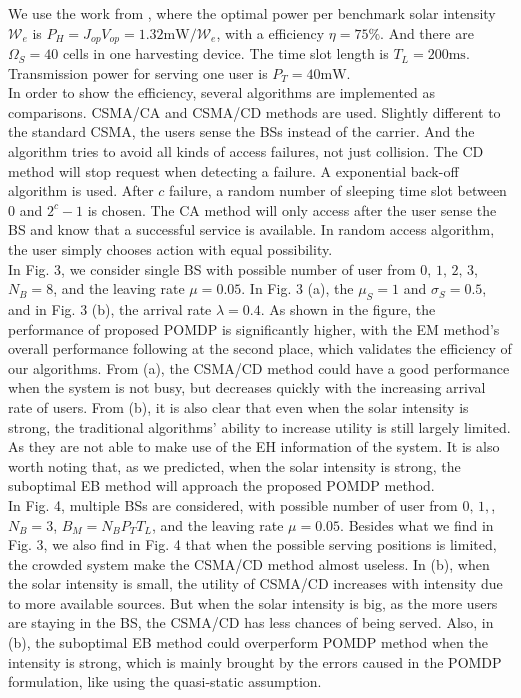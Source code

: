 \documentclass[conference]{IEEEtran}
\begin{document}
We use the work from \cite{circuit}, where the optimal power per benchmark solar intensity \(\mathcal{W}_e\)
is \(P_H = J_{op}V_{op} = 1.32\mbox{mW}/\mathcal{W}_e\), with a efficiency \(\eta = 75 \%\).
And there are \(\Omega_S = 40\) cells in one harvesting device.
The time slot length is \(T_L = 200\mbox{ms}\).
Transmission power for serving one user is \(P_T = 40\mbox{mW}\).\\
\indent In order to show the efficiency, several algorithms are implemented as comparisons.
CSMA/CA and CSMA/CD methods are used.
Slightly different to the standard CSMA, the users sense the BSs instead of the carrier.
And the algorithm tries to avoid all kinds of access failures, not just collision.
The CD method will stop request when detecting a failure. A exponential back-off algorithm is used.
After \(c\) failure, a random number of sleeping time slot between \(0\) and \(2^c - 1\) is chosen.
The CA method will only access after the user sense the BS and know that a successful service is available.
In random access algorithm, the user simply chooses action with equal possibility.\\
\indent In Fig. 3, we consider single BS with possible number of user from \(0,\, 1,\, 2,\, 3\), \(N_B = 8\),
and the leaving rate \(\mu = 0.05\). 
In Fig. 3 (a), the \(\mu_S = 1\) and \(\sigma_S = 0.5\), and in Fig. 3 (b), the arrival rate \(\lambda = 0.4\). 
As shown in the figure, the performance of proposed POMDP is significantly higher,
with the EM method's overall performance following at the second place,
which validates the efficiency of our algorithms.
From (a), the CSMA/CD method could have a good performance when the system is not busy,
but decreases quickly with the increasing arrival rate of users.
From (b), it is also clear that even when the solar intensity is strong, 
the traditional algorithms' ability to increase utility is still largely limited.
As they are not able to make use of the EH information of the system.
It is also worth noting that, as we predicted, when the solar intensity is strong,
the suboptimal EB method will approach the proposed POMDP method.\\
\indent In Fig. 4, multiple BSs are considered, with possible number of user from \(0,\, 1,\), \(N_B = 3\), \(B_M = N_BP_TT_L\),
and the leaving rate \(\mu = 0.05\). 
Besides what we find in Fig. 3, we also find in Fig. 4 
that when the possible serving positions is limited, the crowded system make the CSMA/CD method almost useless.
In (b), when the solar intensity is small, the utility of CSMA/CD increases with intensity due to more available sources.
But when the solar intensity is big, as the more users are staying in the BS, 
the CSMA/CD has less chances of being served.
Also, in (b), the suboptimal EB method could overperform POMDP method when the intensity is strong, 
which is mainly brought by the errors caused in the POMDP formulation, like using the quasi-static assumption.
\end{document}
